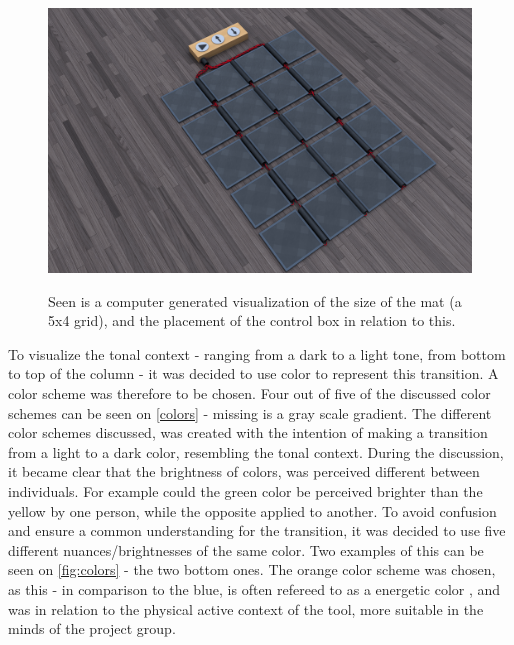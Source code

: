 \begin{figure}[H]
	\centering
	\includegraphics[width=0.8\linewidth]{figure/Design/finaldesign}
	\label{fig:matSize}
	\caption{Seen is a computer generated visualization of the size of the mat (a 5x4 grid), and the placement of the control box in relation to this.}
\end{figure}

To visualize the tonal context - ranging from a dark to a light tone, from bottom to top of the column - it was decided to use color to represent this transition. A color scheme was therefore to be chosen. Four out of five of the discussed color schemes can be seen on \autoref{colors} - missing is a gray scale gradient. The different color schemes discussed, was created with the intention of making a transition from a light to a dark color, resembling the tonal context. During the discussion, it became clear that the brightness of colors, was perceived different between individuals. For example could the green color be perceived brighter than the yellow by one person, while the opposite applied to another. To avoid confusion and ensure a common understanding for the transition, it was decided to use five different nuances/brightnesses of the same color. Two examples of this can be seen on \autoref{fig:colors}  - the two bottom ones. The orange color scheme was chosen, as this - in comparison to the blue, is often refereed to as a energetic color \cite{orange}, and was in relation to the physical active context of the tool, more suitable in the minds of the project group.               

